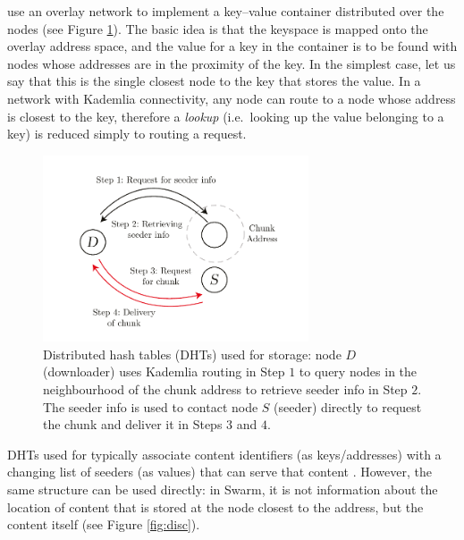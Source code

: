  use an overlay network to implement a key--value container distributed over the nodes (see Figure \ref{fig:DHT}). The basic idea is that the keyspace is mapped onto the overlay address space, and the value for a key in the container is to be found with nodes whose addresses are in the proximity of the key. In the simplest case, let us say that this is the single closest node to the key that stores the value. In a network with Kademlia connectivity, any node can route to a node whose address is closest to the key, therefore a \emph{lookup} (i.e.\ looking up the value belonging to a key) is reduced simply to routing a request. 

\begin{figure}[htbp]
   \centering
   \includegraphics[width=0.7\textwidth]{fig/dht_new.pdf}
   \caption[Distributed hash tables (DHTs) \statusgreen]{Distributed hash tables (DHTs) used for storage:  node $D$ (downloader) uses Kademlia routing in Step $1$ to query nodes in the neighbourhood of the chunk address to retrieve seeder info in Step $2$. The seeder info is used to contact node $S$ (seeder) directly to request the chunk and deliver it in Steps $3$ and $4$.}
   \label{fig:DHT}
\end{figure}

DHTs used for  typically associate content identifiers (as keys/addresses) with a changing list of seeders (as values) that can serve that content \citep{ipfs2014, crosby2007analysis}. However, the same structure can be used directly: in Swarm, it is not information about the location of content that is stored at the node closest to the address, but the content itself (see Figure \ref{fig:disc}). 


